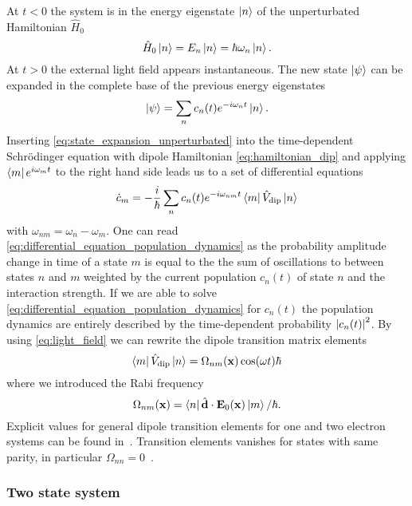 At $t<0$ the system is in the energy eigenstate $\ket{n}$ of the
unperturbated Hamiltonian $\hat{H}_0$
\begin{equation}
  \hat{H}_0\ket{n}
  =E_n\ket{n}
  =\hbar\omega_n\ket{n}
  \label{eq:eigenvalue_energy_unperturbated}.
\end{equation}
At $t>0$ the external light field appears instantaneous. The new state
$\ket{\psi}$ can be expanded in the complete base of the previous energy
eigenstates
\begin{equation}
  \ket{\psi}
  =
  \sum_n{c_n(t)}{e^{-i{\omega_n}t}}\ket{n}
  \label{eq:state_expansion_unperturbated}.
\end{equation}
Inserting \cref{eq:state_expansion_unperturbated} into the time-dependent
Schrödinger equation with dipole Hamiltonian \cref{eq:hamiltonian_dip} and
applying $\bra{m}{e^{i{\omega_m}t}}$ to the right hand side leads us to a set
of differential equations
\begin{equation}
  \dot{c}_m
  =
  -\frac{i}{\hbar}\sum_n{c_n(t)}{e^{-i\omega_{nm}t}}
  \bra{m}\hat{V}_\text{dip}\ket{n}
  \label{eq:differential_equation_population_dynamics}
\end{equation}
with $\omega_{nm}=\omega_n-\omega_m$. One can read
\cref{eq:differential_equation_population_dynamics} as the probability
amplitude change in time of a state $m$ is equal to the the sum of
oscillations to between states $n$ and $m$ weighted by the current population
$c_n(t)$ of state $n$ and the interaction strength. If we are able to solve
\cref{eq:differential_equation_population_dynamics} for $c_n(t)$ the
population dynamics are entirely described by the time-dependent probability
$\abs{c_n(t)}^2$. By using \cref{eq:light_field} we can rewrite the dipole
transition matrix elements
\begin{equation}
  \bra{m}\hat{V}_\text{dip}\ket{n}
  =\Omega_{nm}(\vb{x})\cos(\omega t)\hbar
  \label{eq:elements_dipole_transition_matrix}
\end{equation}
where we introduced the Rabi frequency
\begin{equation}
  \Omega_{nm}(\vb{x})
  =\bra{n}\hat{\vb{d}}\cdot\vb{E}_0(\vb{x})\ket{m}/\hbar
  \label{eq:rabi_frequency}.
\end{equation}
Explicit values for general dipole transition elements for one and two
electron systems can be found in~\cite{Bethe1957}. Transition elements
vanishes for states with same parity, in particular
$\Omega_{nn}=0$~\cite{Bartelmann2018}.

\subsubsection{Two state system}

